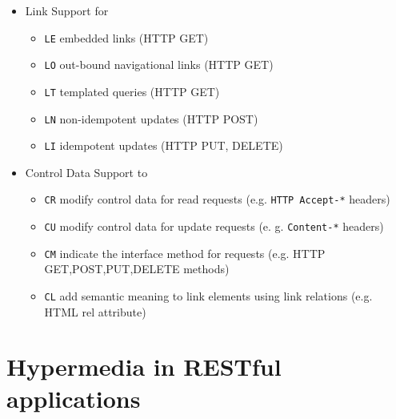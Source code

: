 \documentclass[12pt,a4paper]{scrartcl}		%
\begin{document}
\begin{itemize}
\item Link Support for
  \begin{itemize}
  \item \texttt{LE} embedded links (HTTP GET)
  \item \texttt{LO} out-bound navigational links (HTTP GET)
  \item \texttt{LT} templated queries (HTTP GET)
  \item \texttt{LN} non-idempotent updates (HTTP POST)
  \item \texttt{LI} idempotent updates (HTTP PUT, DELETE) 
  \end{itemize}
\item Control Data Support to
  \begin{itemize}
  \item \texttt{CR} modify control data for read requests (e.g. \texttt{HTTP Accept-*} headers)
  \item \texttt{CU} modify control data for update requests (e. g. \texttt{Content-*} headers)
  \item \texttt{CM} indicate the interface method for requests (e.g. HTTP GET,POST,PUT,DELETE methods)
  \item \texttt{CL} add semantic meaning to link elements using link relations (e.g. HTML rel attribute)
  \end{itemize}
\end{itemize}


\section{Hypermedia in RESTful applications}



\end{document}
